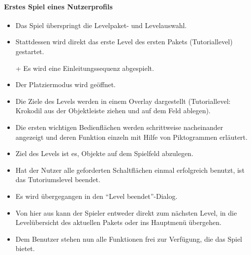 \paragraph{Erstes Spiel eines Nutzerprofils}\mbox{}\newline
\begin{itemize}
\item Das Spiel überspringt die Levelpaket- und Levelauswahl.
\item Stattdessen wird direkt das erste Level des ersten Pakets (Tutoriallevel) gestartet.
\item[+] Es wird eine Einleitungssequenz abgespielt.
\item Der Platziermodus wird geöffnet.
\item Die Ziele des Levels werden in einem Overlay dargestellt (Tutoriallevel: Krokodil aus der Objektleiste ziehen und auf dem Feld ablegen).
\item Die ersten wichtigen Bedienflächen werden schrittweise nacheinander angezeigt und deren Funktion
einzeln mit Hilfe von Piktogrammen erläutert.
\item Ziel des Levels ist es, Objekte auf dem Spielfeld abzulegen.
\item Hat der Nutzer alle geforderten Schaltflächen einmal erfolgreich benutzt, ist das Tutoriumslevel beendet.
\item Es wird übergegangen in den ``Level beendet''-Dialog. 
\item Von hier aus kann der Spieler entweder direkt zum nächsten Level, in die Levelübersicht des aktuellen Pakets oder
ins Hauptmenü übergehen.
\item Dem Benutzer stehen nun alle Funktionen frei zur Verfügung, die das Spiel 
bietet.
\end{itemize}
